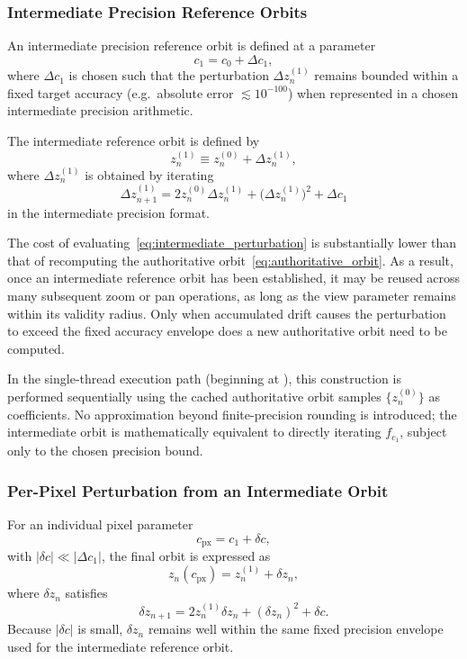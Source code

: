 \subsubsection{Intermediate Precision Reference Orbits}

An intermediate precision reference orbit is defined at a parameter
\[
c_1 = c_0 + \Delta c_1,
\]
where $\Delta c_1$ is chosen such that the perturbation $\Delta z^{(1)}_n$ remains bounded within a fixed target accuracy
(e.g.\ absolute error $\lesssim 10^{-100}$) when represented in a chosen intermediate precision arithmetic.

The intermediate reference orbit is defined by
\[
z^{(1)}_n \equiv z^{(0)}_n + \Delta z^{(1)}_n,
\]
where $\Delta z^{(1)}_n$ is obtained by iterating
\begin{equation}
\Delta z^{(1)}_{n+1}
= 2 z^{(0)}_n \Delta z^{(1)}_n
  + \bigl(\Delta z^{(1)}_n\bigr)^2
  + \Delta c_1
\label{eq:intermediate_perturbation}
\end{equation}
in the intermediate precision format.

The cost of evaluating~\eqref{eq:intermediate_perturbation} is substantially lower than that of recomputing
the authoritative orbit~\eqref{eq:authoritative_orbit}.
As a result, once an intermediate reference orbit has been established, it may be reused across many subsequent zoom
or pan operations, as long as the view parameter remains within its validity radius.
Only when accumulated drift causes the perturbation to exceed the fixed accuracy envelope does a new authoritative
orbit need to be computed.

In the single-thread execution path (beginning at
), this construction is performed
sequentially using the cached authoritative
orbit samples $\{z^{(0)}_n\}$ as coefficients.
No approximation beyond finite-precision rounding is introduced; the intermediate orbit is mathematically equivalent
to directly iterating $f_{c_1}$, subject only to the chosen precision bound.

\subsubsection{Per-Pixel Perturbation from an Intermediate Orbit}

For an individual pixel parameter
\[
c_{\text{px}} = c_1 + \delta c,
\]
with $|\delta c| \ll |\Delta c_1|$, the final orbit is expressed as
\[
z_n(c_{\text{px}}) = z^{(1)}_n + \delta z_n,
\]
where $\delta z_n$ satisfies
\begin{equation}
\delta z_{n+1}
= 2 z^{(1)}_n \delta z_n
  + (\delta z_n)^2
  + \delta c.
\label{eq:pixel_perturbation}
\end{equation}
Because $|\delta c|$ is small, $\delta z_n$ remains well within the same fixed precision envelope used for the
intermediate reference orbit.

